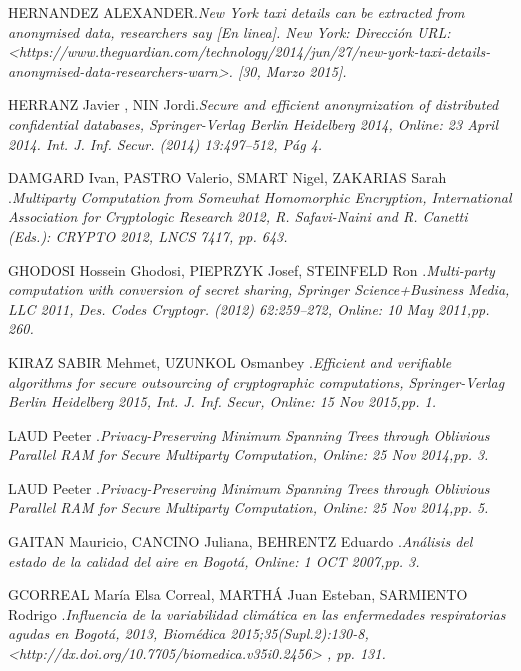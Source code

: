 \documentclass[a4paper, 12pt, oneside]{article}
\theoremstyle{definition}
\theoremstyle{remark}
\begin{document}
\begin{thebibliography}{99}
HERNANDEZ ALEXANDER.\emph{New York taxi details can be extracted from anonymised data, researchers say [En linea]. New York: Dirección URL: <https://www.theguardian.com/technology/2014/jun/27/new-york-taxi-details-anonymised-data-researchers-warn>. [30, Marzo 2015].}

HERRANZ Javier , NIN Jordi.\emph{Secure and efficient anonymization of distributed confidential databases, Springer-Verlag Berlin Heidelberg 2014, Online: 23 April 2014. Int. J. Inf. Secur. (2014) 13:497–512, Pág 4.}

DAMGARD Ivan, PASTRO Valerio, SMART Nigel, ZAKARIAS Sarah .\emph{Multiparty Computation from Somewhat Homomorphic Encryption, International Association for Cryptologic Research 2012, R. Safavi-Naini and R. Canetti (Eds.): CRYPTO 2012, LNCS 7417, pp. 643.}

GHODOSI Hossein Ghodosi, PIEPRZYK Josef, STEINFELD Ron .\emph{Multi-party computation with conversion of secret sharing, Springer Science+Business Media, LLC 2011, Des. Codes Cryptogr. (2012) 62:259–272, Online: 10 May 2011,pp. 260.}

KIRAZ SABIR Mehmet, UZUNKOL Osmanbey .\emph{Efficient and verifiable algorithms for secure outsourcing of cryptographic computations, Springer-Verlag Berlin Heidelberg 2015, Int. J. Inf. Secur, Online: 15 Nov 2015,pp. 1.}

LAUD Peeter .\emph{Privacy-Preserving Minimum Spanning Trees through Oblivious Parallel RAM for Secure Multiparty Computation, Online: 25 Nov 2014,pp. 3.}

LAUD Peeter .\emph{Privacy-Preserving Minimum Spanning Trees through Oblivious Parallel RAM for Secure Multiparty Computation, Online: 25 Nov 2014,pp. 5.}

 GAITAN Mauricio, CANCINO Juliana, BEHRENTZ Eduardo .\emph{Análisis del estado de la calidad del aire en Bogotá, Online: 1 OCT 2007,pp. 3.}

 GCORREAL María Elsa Correal, MARTHÁ Juan Esteban, SARMIENTO Rodrigo .\emph{Influencia de la variabilidad climática en las enfermedades respiratorias agudas en Bogotá, 2013, Biomédica 2015;35(Supl.2):130-8, <http://dx.doi.org/10.7705/biomedica.v35i0.2456> , pp. 131.}


\end{thebibliography}
\end{document}
